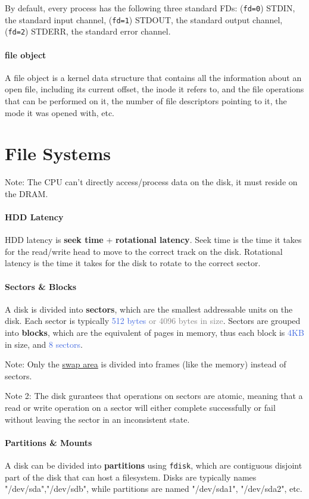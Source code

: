 \documentclass[openany,12pt]{book}
\newcommand{\code}[1]{\texttt{#1}}
\newcommand{\blue}[1]{\textcolor{RoyalBlue}{#1}}
\newcommand{\gray}[1]{\textcolor{gray}{#1}}
\begin{document}
By default, every process has the following three standard FDs: (\code{fd=0}) STDIN, the standard input channel, (\code{fd=1}) STDOUT, the standard output channel, (\code{fd=2}) STDERR, the standard error channel.

\paragraph{file object} A file object is a kernel data structure that contains all the information about an open file, including its current offset, the inode it refers to, and the file operations that can be performed on it, the number of file descriptors pointing to it, the mode it was opened with, etc. 

\section*{File Systems}

Note: The CPU can't directly access/process data on the disk, it must reside on the DRAM.

\paragraph{HDD Latency} HDD latency is \textbf{seek time} + \textbf{rotational latency}. Seek time is the time it takes for the read/write head to move to the correct track on the disk. Rotational latency is the time it takes for the disk to rotate to the correct sector. 


\paragraph{Sectors \& Blocks} A disk is divided into \textbf{sectors}, which are the smallest addressable units on the disk. Each sector is typically \blue{512 bytes}\gray{ or 4096 bytes in size}. Sectors are grouped into \textbf{blocks}, which are the equivalent of pages in memory, thus each block is \blue{4KB} in size, and \blue{8 sectors}.

Note: Only the \ul{swap area} is divided into frames (like the memory) instead of sectors.

Note 2: The disk gurantees that operations on sectors are atomic, meaning that a read or write operation on a sector will either complete successfully or fail without leaving the sector in an inconsistent state.


\paragraph{Partitions \& Mounts} A disk can be divided into \textbf{partitions} using \code{fdisk}, which are contiguous disjoint part of the disk that can host a filesystem. Disks are typically names "/dev/sda","/dev/sdb", while partitions are named "/dev/sda1", "/dev/sda2", etc. 
\end{document}

